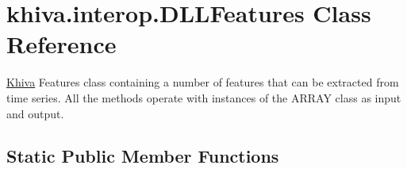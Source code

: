 \hypertarget{classkhiva_1_1interop_1_1_d_l_l_features}{}\section{khiva.\+interop.\+D\+L\+L\+Features Class Reference}
\label{classkhiva_1_1interop_1_1_d_l_l_features}


\mbox{\hyperlink{classkhiva_1_1_khiva}{Khiva}} Features class containing a number of features that can be extracted from time series. All the methods operate with instances of the A\+R\+R\+AY class as input and output.  


\subsection*{Static Public Member Functions}
